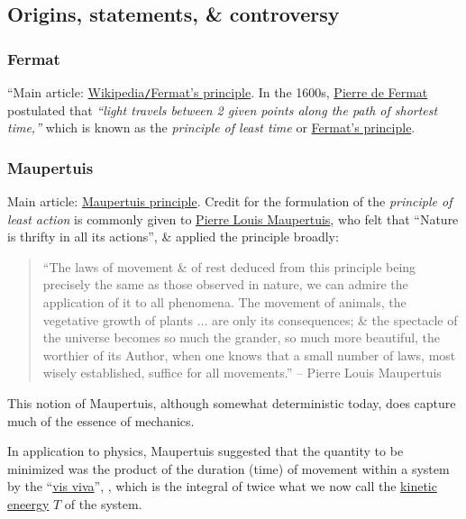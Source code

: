 \documentclass[oneside]{book}
\numberwithin{equation}{section}
\begin{document}
\subsection{Origins, statements, \& controversy}

\subsubsection{Fermat}
``Main article: \href{https://en.wikipedia.org/wiki/Fermat%27s_principle}{Wikipedia\texttt{/}Fermat's principle}. In the 1600s, \href{https://en.wikipedia.org/wiki/Pierre_de_Fermat}{Pierre de Fermat} postulated that \textit{``light travels between 2 given points along the path of shortest time,''} which is known as the \textit{principle of least time} or \href{https://en.wikipedia.org/wiki/Fermat%27s_principle}{Fermat's principle}.

\subsubsection{Maupertuis}
Main article: \href{https://en.wikipedia.org/wiki/Maupertuis_principle}{Maupertuis principle}. Credit for the formulation of the \textit{principle of least action} is commonly given to \href{https://en.wikipedia.org/wiki/Pierre_Louis_Maupertuis}{Pierre Louis Maupertuis}, who felt that ``Nature is thrifty in all its actions'', \& applied the principle broadly:
\begin{quotation}
	``The laws of movement \& of rest deduced from this principle being precisely the same as those observed in nature, we can admire the application of it to all phenomena. The movement of animals, the vegetative growth of plants $\ldots$ are only its consequences; \& the spectacle of the universe becomes so much the grander, so much more beautiful, the worthier of its Author, when one knows that a small number of laws, most wisely established, suffice for all movements.'' -- Pierre Louis Maupertuis
\end{quotation}
This notion of Maupertuis, although somewhat deterministic today, does capture much of the essence of mechanics.

In application to physics, Maupertuis suggested that the quantity to be minimized was the product of the duration (time) of movement within a system by the ``\href{https://en.wikipedia.org/wiki/Vis_viva}{vis viva}'', , which is the integral of twice what we now call the \href{https://en.wikipedia.org/wiki/Kinetic_energy}{kinetic eneergy} $T$ of the system.
\end{document}
